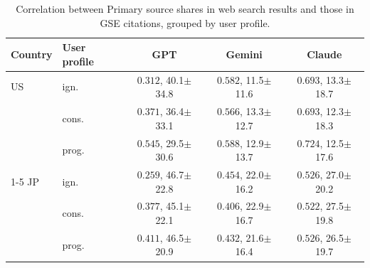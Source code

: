 \begin{table}[t]
\centering
\footnotesize
\setlength{\tabcolsep}{1.8pt}
\caption{Correlation between Primary source shares in web search results and those in GSE citations, grouped by user profile.}
\label{tab:brave-citation-barrier-correlation-persona}
\begin{tabular}{llccc}
\toprule
\textbf{Country} & \textbf{User profile} & \textbf{GPT} & \textbf{Gemini} & \textbf{Claude} \\
\midrule
US & ign. & \textcolor{red!50!black}{$0.312$}, 40.1$\pm$34.8 & \textcolor{red!70!black}{$0.582$}, 11.5$\pm$11.6 & \textcolor{red!70!black}{$0.693$}, 13.3$\pm$18.7 \\
 & cons. & \textcolor{red!50!black}{$0.371$}, 36.4$\pm$33.1 & \textcolor{red!70!black}{$0.566$}, 13.3$\pm$12.7 & \textcolor{red!70!black}{$0.693$}, 12.3$\pm$18.3 \\
 & prog. & \textcolor{red!70!black}{$0.545$}, 29.5$\pm$30.6 & \textcolor{red!70!black}{$0.588$}, 12.9$\pm$13.7 & \textcolor{red!90!black}{$0.724$}, 12.5$\pm$17.6 \\
\cmidrule(lr){1-5}
JP & ign. & \textcolor{red!30!black}{$0.259$}, 46.7$\pm$22.8 & \textcolor{red!50!black}{$0.454$}, 22.0$\pm$16.2 & \textcolor{red!70!black}{$0.526$}, 27.0$\pm$20.2 \\
 & cons. & \textcolor{red!50!black}{$0.377$}, 45.1$\pm$22.1 & \textcolor{red!50!black}{$0.406$}, 22.9$\pm$16.7 & \textcolor{red!70!black}{$0.522$}, 27.5$\pm$19.8 \\
 & prog. & \textcolor{red!50!black}{$0.411$}, 46.5$\pm$20.9 & \textcolor{red!50!black}{$0.432$}, 21.6$\pm$16.4 & \textcolor{red!70!black}{$0.526$}, 26.5$\pm$19.7 \\
\bottomrule
\end{tabular}
\end{table}

